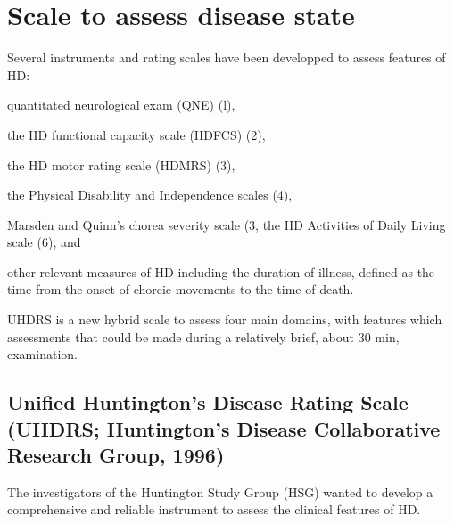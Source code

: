 \section{Scale to assess disease state}

Several instruments and rating scales have been developped to assess features of
HD:

quantitated neurological exam (QNE) (l), 

the HD functional capacity scale (HDFCS) (2), 

the HD motor rating scale (HDMRS) (3), 

the Physical Disability and Independence scales (4), 

Marsden and Quinn's chorea severity scale (3, the HD Activities of Daily Living
scale (6), and 

other relevant measures of HD including the duration of illness, defined as the
time from the onset of choreic movements to the time of death.

UHDRS is a new hybrid scale to assess four main domains, with features which
assessments that could be made during a relatively brief, about 30 min,
examination.


\subsection{Unified Huntington's Disease Rating Scale (UHDRS; Huntington's Disease
Collaborative Research Group, 1996)}
\label{sec:UHDRS}

The investigators of the Huntington Study Group (HSG) wanted to develop a
comprehensive and reliable instrument to assess the clinical features of HD.

